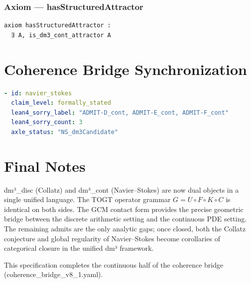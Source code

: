 \documentclass[11pt,a4paper]{article}
\begin{document}
\subsubsection{Axiom — hasStructuredAttractor}
\begin{lstlisting}
axiom hasStructuredAttractor :
  ∃ A, is_dm3_cont_attractor A
\end{lstlisting}

\section{Coherence Bridge Synchronization}

\begin{lstlisting}[language=YAML]
- id: navier_stokes
  claim_level: formally_stated
  lean4_sorry_label: "ADMIT-D_cont, ADMIT-E_cont, ADMIT-F_cont"
  lean4_sorry_count: 3
  axle_status: "NS_dm3Candidate"
\end{lstlisting}

\section{Final Notes}

dm³\_disc (Collatz) and dm³\_cont (Navier–Stokes) are now dual objects in a single unified language. The TOGT operator grammar \(G = U \circ F \circ K \circ C\) is identical on both sides. The GCM contact form provides the precise geometric bridge between the discrete arithmetic setting and the continuous PDE setting. The remaining admits are the only analytic gaps; once closed, both the Collatz conjecture and global regularity of Navier–Stokes become corollaries of categorical closure in the unified dm³ framework.

This specification completes the continuous half of the coherence bridge (coherence\_bridge\_v8\_1.yaml).
\end{document}
